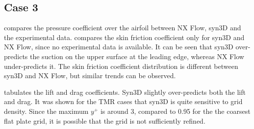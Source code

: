 \subsection{Case 3}
%
%
 compares the pressure coefficient over the airfoil between NX Flow, syn3D and the experimental data.  compares the skin friction coefficient only for syn3D and NX Flow, since no experimental data is available. It can be seen that syn3D over-predicts the suction on the upper surface at the leading edge, whereas NX Flow under-predicts it. The skin friction coefficient distribution is different between syn3D and NX Flow, but similar trends can be observed.

 tabulates the lift and drag coefficients. Syn3D slightly over-predicts both the lift and drag. It was shown for the TMR cases that syn3D is quite sensitive to grid density. Since the maximum $y^+$ is around 3, compared to 0.95 for the the coarsest flat plate grid, it is possible that the grid is not sufficiently refined.

